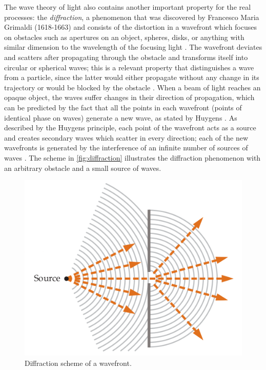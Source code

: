 The wave theory of light also contains another important property for the real processes: the \emph{diffraction}, a phenomenon that was discovered by Francesco Maria Grimaldi (1618-1663) and consists of the distortion in a wavefront which focuses on obstacles such as apertures on an object, spheres, disks, or anything with similar dimension to the wavelength of the focusing light \cite{zilio2009optica}. The wavefront deviates and scatters after propagating through the obstacle and transforms itself into circular or spherical waves; this is a relevant property that distinguishes a wave from a particle, since the latter would either propagate without any change in its trajectory or would be blocked by the obstacle \cite{tipler2007physics}. When a beam of light reaches an opaque object, the waves suffer changes in their direction of propagation, which can be predicted by the fact that all the points in each wavefront (points of identical phase on waves) generate a new wave, as stated by Huygens \cite{fowles1989introduction}. As described by the Huygens principle, each point of the wavefront acts as a source and creates secondary waves which scatter in every direction; each of the new wavefronts is generated by the interference of an infinite number of sources of waves \cite{zilio2009optica}. The scheme in \autoref{fig:diffraction} illustrates the diffraction phenomenon with an arbitrary obstacle and a small source of waves.

\begin{figure}[htb]
	\centering
	\caption{\label{fig:diffraction} Diffraction scheme of a wavefront.}
	\begin{center}
	    \includegraphics[scale=0.5]{images/diffraction.png}
	\end{center}
	\centering
\end{figure}

